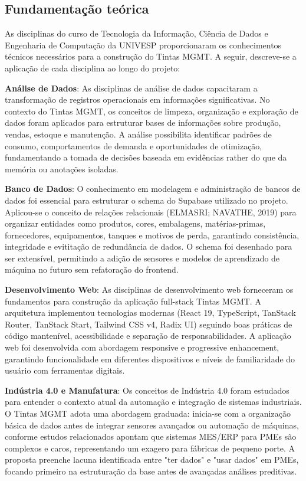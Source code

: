 \documentclass[12pt,a4paper]{article}
\begin{document}
\subsection{Fundamentação teórica}

As disciplinas do curso de Tecnologia da Informação, Ciência de Dados e Engenharia de Computação da UNIVESP proporcionaram os conhecimentos técnicos necessários para a construção do Tintas MGMT. A seguir, descreve-se a aplicação de cada disciplina ao longo do projeto:

\textbf{Análise de Dados}: As disciplinas de análise de dados capacitaram a transformação de registros operacionais em informações significativas. No contexto do Tintas MGMT, os conceitos de limpeza, organização e exploração de dados foram aplicados para estruturar bases de informações sobre produção, vendas, estoque e manutenção. A análise possibilita identificar padrões de consumo, comportamentos de demanda e oportunidades de otimização, fundamentando a tomada de decisões baseada em evidências rather do que da memória ou anotações isoladas.

\textbf{Banco de Dados}: O conhecimento em modelagem e administração de bancos de dados foi essencial para estruturar o schema do Supabase utilizado no projeto. Aplicou-se o conceito de relações relacionais (ELMASRI; NAVATHE, 2019) para organizar entidades como produtos, cores, embalagens, matérias-primas, fornecedores, equipamentos, tanques e motivos de perda, garantindo consistência, integridade e evititação de redundância de dados. O schema foi desenhado para ser extensível, permitindo a adição de sensores e modelos de aprendizado de máquina no futuro sem refatoração do frontend.

\textbf{Desenvolvimento Web}: As disciplinas de desenvolvimento web forneceram os fundamentos para construção da aplicação full-stack Tintas MGMT. A arquitetura implementou tecnologias modernas (React 19, TypeScript, TanStack Router, TanStack Start, Tailwind CSS v4, Radix UI) seguindo boas práticas de código mantenível, acessibilidade e separação de responsabilidades. A aplicação web foi desenvolvida com abordagem responsive e progressive enhancement, garantindo funcionalidade em diferentes dispositivos e níveis de familiaridade do usuário com ferramentas digitais.

\textbf{Indústria 4.0 e Manufatura}: Os conceitos de Indústria 4.0 foram estudados para entender o contexto atual da automação e integração de sistemas industriais. O Tintas MGMT adota uma abordagem graduada: inicia-se com a organização básica de dados antes de integrar sensores avançados ou automação de máquinas, conforme estudos relacionados apontam que sistemas MES/ERP para PMEs são complexos e caros, representando um exagero para fábricas de pequeno porte. A proposta preenche lacuna identificada entre "ter dados" e "usar dados" em PMEs, focando primeiro na estruturação da base antes de avançadas análises preditivas.
\end{document}
